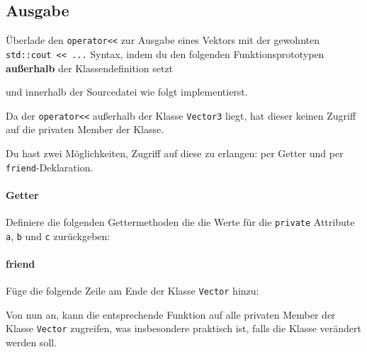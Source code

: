 \subsection{Ausgabe}
Überlade den \lstinline{operator<<} zur Ausgabe eines Vektors mit der gewohnten \lstinline{std::cout << ...} Syntax, indem du den folgenden Funktionsprototypen \textbf{außerhalb} der Klassendefinition setzt

  

und innerhalb der Sourcedatei wie folgt implementierst.

  

Da der \lstinline{operator<<} außerhalb der Klasse \lstinline{Vector3} liegt, hat dieser keinen Zugriff auf die privaten Member der Klasse.

Du hast zwei Möglichkeiten, Zugriff auf diese zu erlangen: per Getter und per \lstinline{friend}-Deklaration.

\paragraph{Getter}
Definiere die folgenden Gettermethoden die die Werte für die \lstinline{private} Attribute \lstinline{a}, \lstinline{b} und \lstinline{c} zurückgeben:
  

\paragraph{friend}
Füge die folgende Zeile am Ende der Klasse \texttt{Vector} hinzu:
  
Von nun an, kann die entsprechende Funktion auf alle privaten Member der Klasse \texttt{Vector} zugreifen, was insbesondere praktisch ist, falls die Klasse verändert werden soll.



